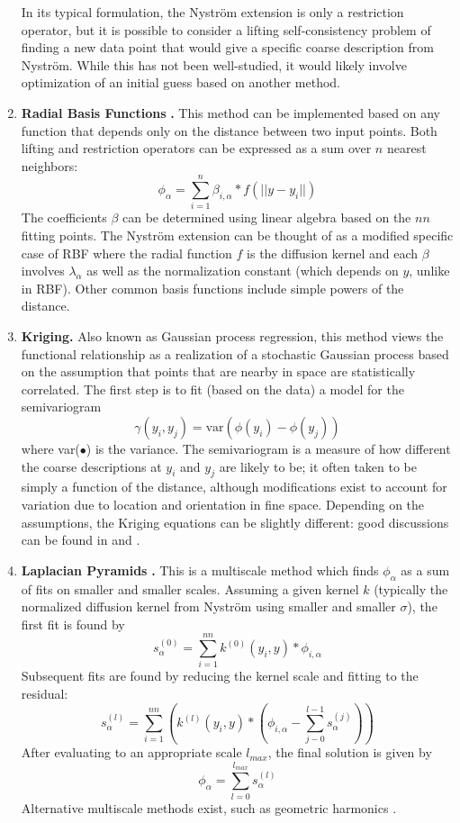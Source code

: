 \documentclass[12pt]{article}
\begin{document}
\begin{enumerate}
In its typical formulation, the Nystr\"om extension is only a restriction operator, but it is possible to consider a lifting self-consistency problem of finding a new data point that would give a specific coarse description from Nystr\"om. While this has not been well-studied, it would likely involve optimization of an initial guess based on another method.
\item \textbf{Radial Basis Functions }\cite{Press2007}\textbf{.}   This method can be implemented based on any function that depends only on the distance between two input points. Both lifting and restriction operators can be expressed as a sum over $n$ nearest neighbors:
\[
\phi_{\alpha} =\sum_{i=1}^{n} \beta_{i,\alpha}*f(||y-y_i||)
\]
The coefficients $\beta$ can be determined using linear algebra based on the $nn$ fitting points. The Nystr\"om extension can be thought of as a modified specific case of RBF where the radial function $f$ is the diffusion kernel and each $\beta$ involves $\lambda_\alpha$ as well as the normalization constant (which depends on $y$, unlike in RBF). Other common basis functions include simple powers of the distance.
\item \textbf{Kriging.} Also known as Gaussian process regression, this method views the functional relationship as a realization of a stochastic Gaussian process based on the assumption that points that are nearby in space are statistically correlated. The first step is to fit (based on the data) a model for the semivariogram
\[
\gamma(y_i,y_j)=\mathrm{var}(\phi(y_i)-\phi(y_j))
\]
where var($\bullet$) is the variance. The semivariogram is a measure of how different the coarse descriptions at $y_i$ and $y_j$ are likely to be; it often taken to be simply a function of the distance, although modifications exist to account for variation due to location and orientation in fine space. Depending on the assumptions, the Kriging equations can be slightly different: good discussions can be found in \cite{Press2007} and \cite{Isaaks1989}.
\item \textbf{Laplacian Pyramids }\cite{Dsilva2013, Rabin2012}\textbf{.}   This is a multiscale method which finds $\phi_\alpha$ as a sum of fits on smaller and smaller scales. Assuming a given kernel $k$ (typically the normalized diffusion kernel from Nystr\"om using smaller and smaller $\sigma$), the first fit is found by
\[
s^{(0)}_\alpha=\sum_{i=1}^{nn} k^{(0)}(y_i,y)*\phi_{i,\alpha}
\]
Subsequent fits are found by reducing the kernel scale and fitting to the residual:
\[
s^{(l)}_\alpha=\sum_{i=1}^{nn} \left( k^{(l)}(y_i,y)*(\phi_{i,\alpha}-\sum_{j-0}^{l-1}s^{(j)}_\alpha )\right)
\]
After evaluating to an appropriate scale $l_{max}$, the final solution is given by
\[
\phi_\alpha=\sum_{l=0}^{l_{max}}s^{(l)}_\alpha
\]
Alternative multiscale methods exist, such as geometric harmonics \cite{Coifman2006b}.
\end{enumerate}
\end{document}
